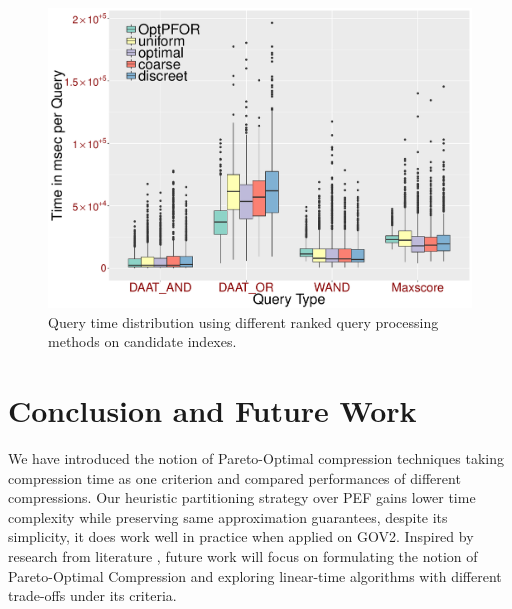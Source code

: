 \documentclass[runningheads,a4paper]{llncs}
\begin{document}
\begin{figure}
	\centering
	\includegraphics[width=0.7\linewidth]{queries}
	\caption{Query time distribution using different ranked query processing methods on candidate indexes.}
	\label{fig:queries}
\end{figure}

\section{Conclusion and Future Work}\label{sec:conclusion}

We have introduced the notion of Pareto-Optimal compression techniques taking compression time as one criterion and compared performances of different compressions. Our heuristic partitioning strategy over PEF gains lower time complexity while preserving same approximation guarantees,
despite its simplicity, it does work well in practice when applied on GOV2.
Inspired by research from literature \cite{wang2016efficiency,zhang2014lns,shorfuzzaman2012allocating,lai2013semantic,tudor2009experiences}, future work will focus on formulating the notion of Pareto-Optimal Compression and exploring linear-time algorithms with different trade-offs under its criteria.



\end{document}
